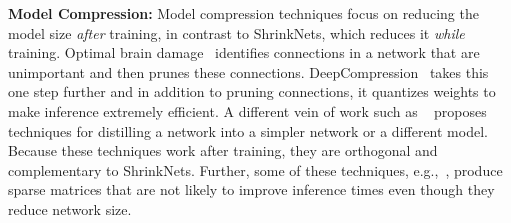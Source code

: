 
\noindent\textbf{Model Compression: }Model compression techniques focus on
reducing the model size \emph{after} training, in contrast to ShrinkNets, which
reduces it \emph{while} training. 
Optimal brain damage~\cite{Cun} identifies connections in a network that are
unimportant and then prunes these connections.
DeepCompression~\cite{han2015deepcompression} takes this one step further and in
addition to pruning connections, it quantizes weights to make inference
extremely efficient.  A different vein of work such as ~\cite{romero2014fitnets,
hinton2015distilling} proposes techniques for distilling a network into a
simpler network or a different model. Because these techniques work after
training, they are orthogonal and complementary to ShrinkNets. Further,
some of these techniques, e.g.,~\cite{Han2015,Cun}, produce sparse matrices that
are not likely to improve inference times even though they reduce network size.



